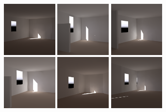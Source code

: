 \documentclass[review]{vgtc}                 %
\begin{document}
\begin{figure}[t]
\includegraphics[width=1.1in]{images/renderings/renovations/063_camera_chris_march_crop.png} \hfill   %
\includegraphics[width=1.1in]{images/renderings/renovations/050_camera_chris_march.png} \hfill   %
\includegraphics[width=1.1in]{images/renderings/no_renovations/070_camera_chris_march.png} \hfill        %
\includegraphics[width=1.1in]{images/renderings/renovations/098_camera_chris_march.png} \hfill   %
\includegraphics[width=1.1in]{images/renderings/no_renovations/user_085_camera_chris_march.png} \hfill   %
\includegraphics[width=1.1in]{images/renderings/renovations/user_046_camera_chris_march.png}\vspace{-0.13in}\\   %


\end{figure}
\end{document}

